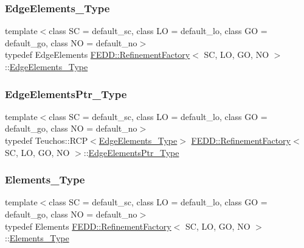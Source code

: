 \subsubsection{\texorpdfstring{Edge\+Elements\+\_\+\+Type}{EdgeElements\_Type}}
{\footnotesize\ttfamily template$<$class SC  = default\+\_\+sc, class LO  = default\+\_\+lo, class GO  = default\+\_\+go, class NO  = default\+\_\+no$>$ \\
typedef Edge\+Elements \hyperlink{classFEDD_1_1RefinementFactory}{F\+E\+D\+D\+::\+Refinement\+Factory}$<$ SC, LO, GO, NO $>$\+::\hyperlink{classFEDD_1_1RefinementFactory_a11b30196ff403358f3540117f09b6963}{Edge\+Elements\+\_\+\+Type}}

\mbox{\label{classFEDD_1_1RefinementFactory_ae5285e990ec4632d6188a1280627ad13}} 
\subsubsection{\texorpdfstring{Edge\+Elements\+Ptr\+\_\+\+Type}{EdgeElementsPtr\_Type}}
{\footnotesize\ttfamily template$<$class SC  = default\+\_\+sc, class LO  = default\+\_\+lo, class GO  = default\+\_\+go, class NO  = default\+\_\+no$>$ \\
typedef Teuchos\+::\+R\+CP$<$\hyperlink{classFEDD_1_1RefinementFactory_a11b30196ff403358f3540117f09b6963}{Edge\+Elements\+\_\+\+Type}$>$ \hyperlink{classFEDD_1_1RefinementFactory}{F\+E\+D\+D\+::\+Refinement\+Factory}$<$ SC, LO, GO, NO $>$\+::\hyperlink{classFEDD_1_1RefinementFactory_ae5285e990ec4632d6188a1280627ad13}{Edge\+Elements\+Ptr\+\_\+\+Type}}

\mbox{\label{classFEDD_1_1RefinementFactory_a0879b04ac1b1830fae7d6a7e29d36000}} 
\subsubsection{\texorpdfstring{Elements\+\_\+\+Type}{Elements\_Type}}
{\footnotesize\ttfamily template$<$class SC  = default\+\_\+sc, class LO  = default\+\_\+lo, class GO  = default\+\_\+go, class NO  = default\+\_\+no$>$ \\
typedef Elements \hyperlink{classFEDD_1_1RefinementFactory}{F\+E\+D\+D\+::\+Refinement\+Factory}$<$ SC, LO, GO, NO $>$\+::\hyperlink{classFEDD_1_1RefinementFactory_a0879b04ac1b1830fae7d6a7e29d36000}{Elements\+\_\+\+Type}}


